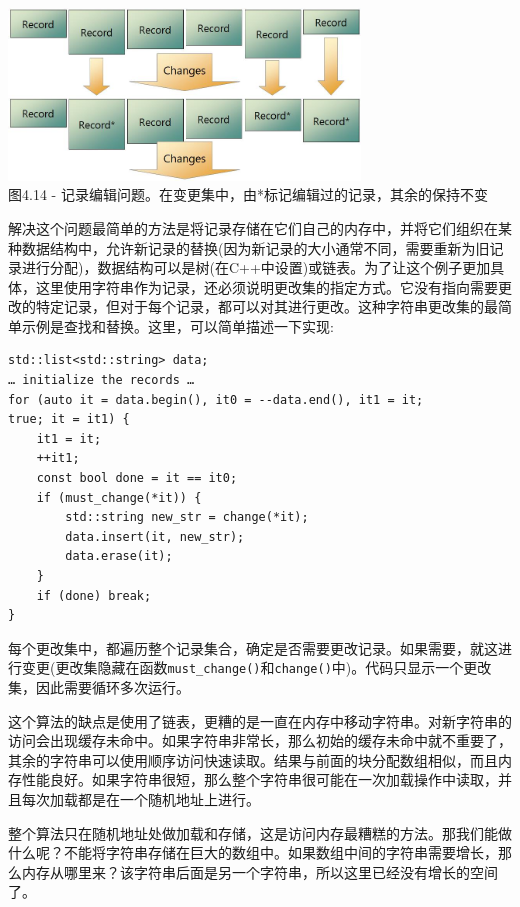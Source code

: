 \begin{center}
\includegraphics[width=0.7\textwidth]{content/1/chapter4/images/14.jpg}\\
图4.14 - 记录编辑问题。在变更集中，由*标记编辑过的记录，其余的保持不变
\end{center}

解决这个问题最简单的方法是将记录存储在它们自己的内存中，并将它们组织在某种数据结构中，允许新记录的替换(因为新记录的大小通常不同，需要重新为旧记录进行分配)，数据结构可以是树(在C++中设置)或链表。为了让这个例子更加具体，这里使用字符串作为记录，还必须说明更改集的指定方式。它没有指向需要更改的特定记录，但对于每个记录，都可以对其进行更改。这种字符串更改集的最简单示例是查找和替换。这里，可以简单描述一下实现:

\begin{lstlisting}[style=styleCXX]
std::list<std::string> data;
… initialize the records …
for (auto it = data.begin(), it0 = --data.end(), it1 = it;
true; it = it1) {
	it1 = it;
	++it1;
	const bool done = it == it0;
	if (must_change(*it)) {
		std::string new_str = change(*it);
		data.insert(it, new_str);
		data.erase(it);
	}
	if (done) break;
}
\end{lstlisting}

每个更改集中，都遍历整个记录集合，确定是否需要更改记录。如果需要，就这进行变更(更改集隐藏在函数\texttt{must\_change()}和\texttt{change()}中)。代码只显示一个更改集，因此需要循环多次运行。

这个算法的缺点是使用了链表，更糟的是一直在内存中移动字符串。对新字符串的访问会出现缓存未命中。如果字符串非常长，那么初始的缓存未命中就不重要了，其余的字符串可以使用顺序访问快速读取。结果与前面的块分配数组相似，而且内存性能良好。如果字符串很短，那么整个字符串很可能在一次加载操作中读取，并且每次加载都是在一个随机地址上进行。

整个算法只在随机地址处做加载和存储，这是访问内存最糟糕的方法。那我们能做什么呢？不能将字符串存储在巨大的数组中。如果数组中间的字符串需要增长，那么内存从哪里来？该字符串后面是另一个字符串，所以这里已经没有增长的空间了。

